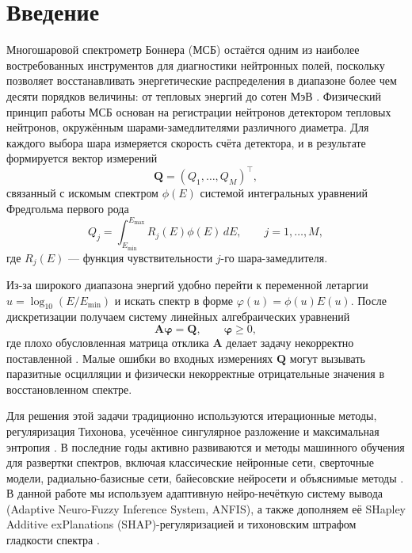\section{Введение}

Многошаровой спектрометр Боннера (МСБ) остаётся одним из наиболее востребованных инструментов для диагностики нейтронных полей, поскольку позволяет восстанавливать энергетические распределения в диапазоне более чем десяти порядков величины: от тепловых энергий до сотен МэВ \cite{chizhov2025tsvd,Compen_IAEA}. Физический принцип работы МСБ основан на регистрации нейтронов детектором тепловых нейтронов, окружённым шарами-замедлителями различного диаметра. Для каждого выбора шара измеряется скорость счёта детектора, и в результате формируется вектор измерений
\begin{equation}
\mathbf{Q} = (Q_1,\dots,Q_M)^\top,
\end{equation}
связанный с искомым спектром $\phi(E)$ системой интегральных уравнений Фредгольма первого рода
\begin{equation}
Q_j = \int_{E_{\min}}^{E_{\max}} R_j(E)\phi(E)\,dE,
\qquad j=1,\dots,M,
\end{equation}
где $R_j(E)$ --- функция чувствительности $j$-го шара-замедлителя.

Из-за широкого диапазона энергий удобно перейти к переменной летаргии $u=\log_{10}(E/E_{\min})$ и искать спектр в форме $\varphi(u)=\phi(u)E(u)$. После дискретизации получаем систему линейных алгебраических уравнений
\begin{equation}
\mathbf{A}\boldsymbol{\varphi}=\mathbf{Q}, \qquad \boldsymbol{\varphi}\ge 0,
\end{equation}
где плохо обусловленная матрица отклика $\mathbf{A}$ делает задачу некорректно поставленной \cite{chizhov_optimization_2024,Tikhonov1990}. Малые ошибки во входных измерениях $\mathbf{Q}$ могут вызывать паразитные осцилляции и физически некорректные отрицательные значения в восстановленном спектре.

Для решения этой задачи традиционно используются итерационные методы, регуляризация Тихонова, усечённое сингулярное разложение и максимальная энтропия \cite{chizhov2025tsvd,borshchevmaxed2026}. В последние годы активно развиваются и методы машинного обучения для развертки спектров, включая классические нейронные сети, сверточные модели, радиально-базисные сети, байесовские нейросети и объяснимые методы \cite{ortiz2014neutron,bouhadida2023neutron,zhou2025bayesian,chizhov_random_2025}. В данной работе мы используем адаптивную нейро-нечёткую систему вывода (Adaptive Neuro-Fuzzy Inference System, ANFIS), а также дополняем её SHapley Additive exPlanations (SHAP)-регуляризацией и тихоновским штрафом гладкости спектра \cite{Bonneranfis2026}.

